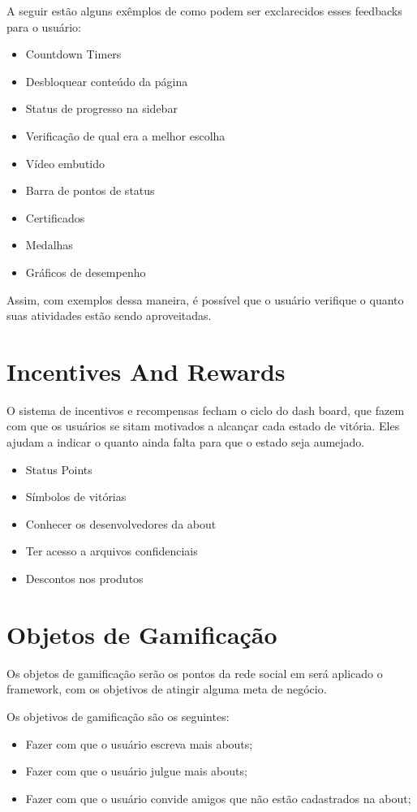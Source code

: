 A seguir estão alguns exêmplos de como podem ser exclarecidos esses feedbacks para o usuário:

\begin{itemize}
    \item Countdown Timers
    \item Desbloquear conteúdo da página
    \item Status de progresso na sidebar
    \item Verificação de qual era a melhor escolha
    \item Vídeo embutido
    \item Barra de pontos de status
    \item Certificados
    \item Medalhas
    \item Gráficos de desempenho
\end{itemize}

Assim, com exemplos dessa maneira, é possível que o usuário verifique o quanto suas atividades estão
sendo aproveitadas.

\section{Incentives And Rewards}
\label{sub:incentives_and_rewards}
O sistema de incentivos e recompensas fecham o ciclo do dash board, que fazem com que 
os usuários se sitam motivados a alcançar cada estado de vitória. Eles ajudam a indicar
o quanto ainda falta para que o estado seja aumejado.

\begin{itemize}
    \item Status Points
    \item Símbolos de vitórias
    \item Conhecer os desenvolvedores da about
    \item Ter acesso a arquivos confidenciais
    \item Descontos nos produtos
\end{itemize}

\section{Objetos de Gamificação}
\label{sec:objetodegamificacao}
Os objetos de gamificação serão os pontos da rede social em será aplicado o framework,
com os objetivos de atingir alguma meta de negócio.

Os objetivos de gamificação são os seguintes:

\begin{itemize}
    \item Fazer com que o usuário escreva mais abouts;
    \item Fazer com que o usuário julgue mais abouts;
    \item Fazer com que o usuário convide amigos que não estão cadastrados na about;
\end{itemize}
